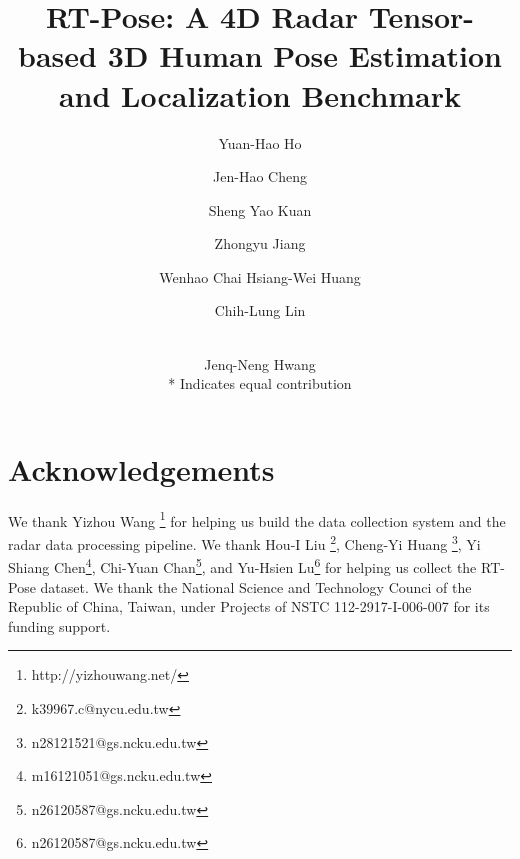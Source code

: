 \documentclass[runningheads]{llncs}
\begin{document}
\title{RT-Pose: A 4D Radar Tensor-based 3D Human Pose Estimation and Localization Benchmark} 


\author{Yuan-Hao Ho \and
Jen-Hao Cheng \and
Sheng Yao Kuan \and
Zhongyu Jiang \and
Wenhao Chai
Hsiang-Wei Huang \and
Chih-Lung Lin \and \\ 
Jenq-Neng Hwang
\\ * Indicates equal contribution
}




\maketitle








\section*{Acknowledgements}
We thank Yizhou Wang \footnote{http://yizhouwang.net/} for helping us build the data collection system and the radar data processing pipeline.
We thank Hou-I Liu \footnote{k39967.c@nycu.edu.tw}, Cheng-Yi Huang \footnote{n28121521@gs.ncku.edu.tw}, Yi Shiang Chen\footnote{m16121051@gs.ncku.edu.tw},  Chi-Yuan Chan\footnote{n26120587@gs.ncku.edu.tw}, and Yu-Hsien Lu\footnote{n26120587@gs.ncku.edu.tw} for helping us collect the RT-Pose dataset. 
We thank the National Science and Technology Counci of the Republic of China, Taiwan, under Projects of NSTC 112-2917-I-006-007 for its funding support.




\end{document}
